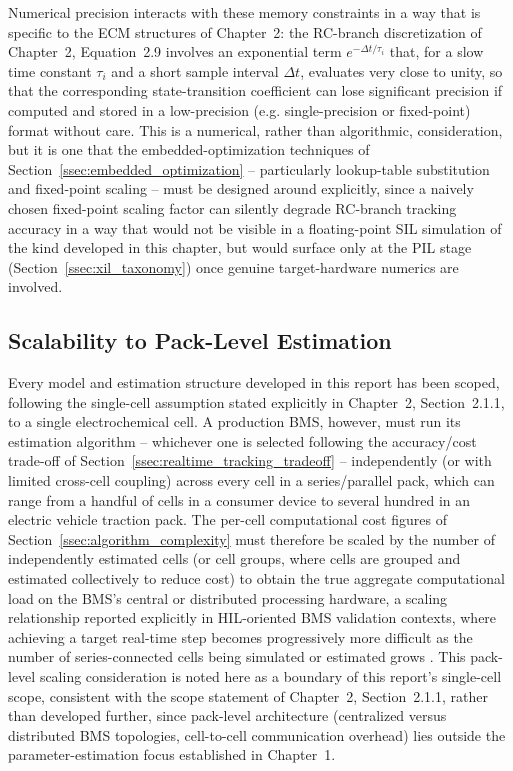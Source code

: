 Numerical precision interacts with these memory constraints in a way that is specific to the ECM structures of Chapter~2: the RC-branch discretization of Chapter~2, Equation~2.9 involves an exponential term $e^{-\Delta t/\tau_i}$ that, for a slow time constant $\tau_i$ and a short sample interval $\Delta t$, evaluates very close to unity, so that the corresponding state-transition coefficient can lose significant precision if computed and stored in a low-precision (e.g. single-precision or fixed-point) format without care. This is a numerical, rather than algorithmic, consideration, but it is one that the embedded-optimization techniques of Section~\ref{ssec:embedded_optimization} -- particularly lookup-table substitution and fixed-point scaling -- must be designed around explicitly, since a naively chosen fixed-point scaling factor can silently degrade RC-branch tracking accuracy in a way that would not be visible in a floating-point SIL simulation of the kind developed in this chapter, but would surface only at the PIL stage (Section~\ref{ssec:xil_taxonomy}) once genuine target-hardware numerics are involved.

\subsection{Scalability to Pack-Level Estimation}
\label{ssec:pack_scalability}

Every model and estimation structure developed in this report has been scoped, following the single-cell assumption stated explicitly in Chapter~2, Section~2.1.1, to a single electrochemical cell. A production BMS, however, must run its estimation algorithm -- whichever one is selected following the accuracy/cost trade-off of Section~\ref{ssec:realtime_tracking_tradeoff} -- independently (or with limited cross-cell coupling) across every cell in a series/parallel pack, which can range from a handful of cells in a consumer device to several hundred in an electric vehicle traction pack. The per-cell computational cost figures of Section~\ref{ssec:algorithm_complexity} must therefore be scaled by the number of independently estimated cells (or cell groups, where cells are grouped and estimated collectively to reduce cost) to obtain the true aggregate computational load on the BMS's central or distributed processing hardware, a scaling relationship reported explicitly in HIL-oriented BMS validation contexts, where achieving a target real-time step becomes progressively more difficult as the number of series-connected cells being simulated or estimated grows \cite{mathworks_hil_bms_video}. This pack-level scaling consideration is noted here as a boundary of this report's single-cell scope, consistent with the scope statement of Chapter~2, Section~2.1.1, rather than developed further, since pack-level architecture (centralized versus distributed BMS topologies, cell-to-cell communication overhead) lies outside the parameter-estimation focus established in Chapter~1.

